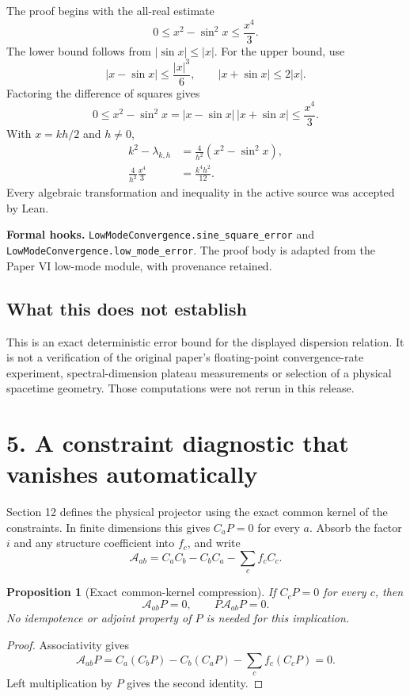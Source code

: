 \documentclass[11pt]{article}
\newcommand{\code}[1]{{\small\nolinkurl{#1}}}
\newtheorem{proposition}{Proposition}
\begin{document}
The proof begins with the all-real estimate
\[
0\le x^2-\sin^2x\le\frac{x^4}{3}.
\]
The lower bound follows from $|\sin x|\le|x|$. For the upper bound, use
\[
|x-\sin x|\le\frac{|x|^3}{6},\qquad
|x+\sin x|\le2|x|.
\]
Factoring the difference of squares gives
\[
0\le x^2-\sin^2x
=|x-\sin x|\,|x+\sin x|
\le\frac{x^4}{3}.
\]
With $x=kh/2$ and $h\ne0$,
\begin{align*}
k^2-\lambda_{k,h}
&=\frac4{h^2}\left(x^2-\sin^2x\right),\\
\frac4{h^2}\frac{x^4}{3}
&=\frac{k^4h^2}{12}.
\end{align*}
Every algebraic transformation and inequality in the active source was accepted by Lean.

\textbf{Formal hooks.} \code{LowModeConvergence.sine_square_error} and
\code{LowModeConvergence.low_mode_error}.
The proof body is adapted from the Paper VI low-mode module, with provenance retained.

\subsection*{What this does not establish}
This is an exact deterministic error bound for the displayed dispersion relation. It is not a verification of the original paper's floating-point convergence-rate experiment, spectral-dimension plateau measurements or selection of a physical spacetime geometry. Those computations were not rerun in this release.

\clearpage
\section*{5. A constraint diagnostic that vanishes automatically}
Section 12 defines the physical projector using the exact common kernel of the constraints. In finite dimensions this gives $C_aP=0$ for every $a$. Absorb the factor $i$ and any structure coefficient into $f_c$, and write
\[
\mathcal A_{ab}=C_aC_b-C_bC_a-\sum_cf_cC_c.
\]
\begin{proposition}[Exact common-kernel compression]
If $C_cP=0$ for every $c$, then
\[
\mathcal A_{ab}P=0,\qquad P\mathcal A_{ab}P=0.
\]
No idempotence or adjoint property of $P$ is needed for this implication.
\end{proposition}
\begin{proof}
Associativity gives
\[
\mathcal A_{ab}P=C_a(C_bP)-C_b(C_aP)-\sum_cf_c(C_cP)=0.
\]
Left multiplication by $P$ gives the second identity.
\end{proof}
\end{document}
